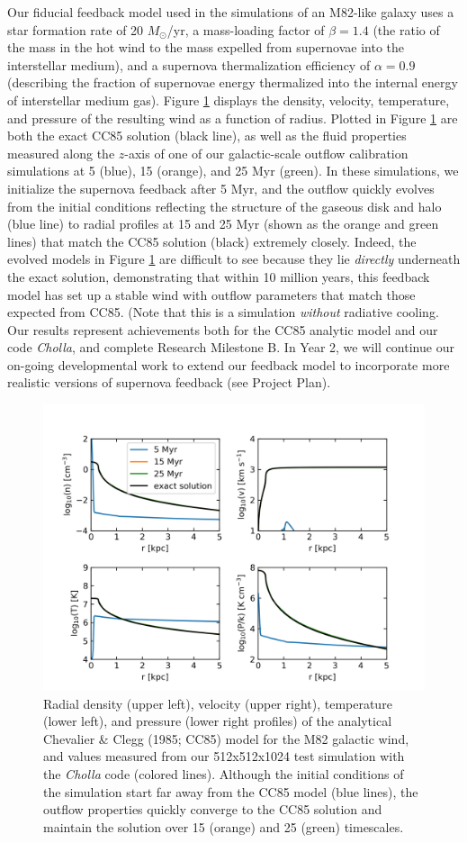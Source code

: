 \documentclass[11pt,letterpaper,english]{article}
\begin{document}
Our fiducial feedback model used in the simulations of an M82-like galaxy uses a star formation rate of 
20 $M_\odot$/yr, a mass-loading factor of $\beta = 1.4$ (the ratio of the mass in the hot wind to the
mass expelled from supernovae into the interstellar medium), and a supernova thermalization efficiency of 
$\alpha = 0.9$ (describing the fraction of supernovae energy thermalized into the internal energy of interstellar medium gas). Figure \ref{fig:CC85} displays the density, velocity, temperature, and pressure of the resulting wind as a function of radius. Plotted in Figure \ref{fig:CC85} are both the exact CC85 solution (black line), as well as the fluid properties measured along the $z$-axis of one of our galactic-scale outflow calibration simulations at 5 (blue), 15 (orange), and 25 Myr (green). In these simulations, we initialize the supernova feedback after 5 Myr, and the outflow quickly evolves from the initial conditions reflecting the structure of the gaseous disk and halo (blue line) to radial profiles
at 15 and 25 Myr (shown as the orange and green lines) that match the CC85 solution (black) extremely
closely. Indeed, the evolved models in Figure \ref{fig:CC85} are difficult to see because they lie \textit{directly} underneath the exact solution, demonstrating that within 10 million years, this feedback model has set up a stable wind with outflow parameters that match those expected from CC85. (Note that this is a simulation \textit{without} radiative cooling. Our results represent achievements both for the CC85 analytic model and our code \textit{Cholla}, and complete Research Milestone B.
In Year 2, we will continue our on-going developmental work to extend our feedback model to incorporate more realistic versions of supernova feedback (see Project Plan).

\begin{figure}[h]
\centering
\includegraphics[width=0.8\linewidth]{CC85.png}
\caption{Radial density (upper left), velocity (upper right), temperature (lower left), and pressure (lower right profiles) of the analytical Chevalier \& Clegg (1985; CC85) model for the M82 galactic wind, and values measured from our 512x512x1024 test simulation with the \textit{Cholla} code (colored lines). 
Although the initial conditions of the simulation start far away from the CC85 model (blue lines), the
outflow properties quickly converge to the CC85 solution and maintain the solution over
15 (orange) and 25 (green) timescales.}
\label{fig:CC85}
\end{figure}
\end{document}
